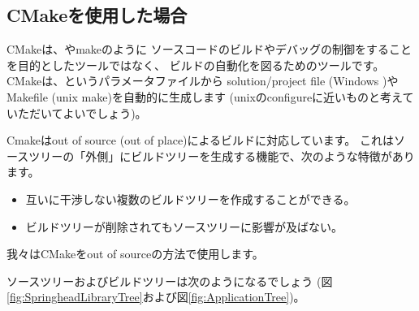 \subsection{CMakeを使用した場合}
\label{subsec:WhenUsedCMake}

\noindent
CMakeは、\VS やmakeのように
ソースコードのビルドやデバッグの制御をすることを目的としたツールではなく、
ビルドの自動化を図るためのツールです。
CMakeは、\CMakeLists{}というパラメータファイルから
solution/project file (Windows \VS)やMakefile (unix make)を自動的に生成します
(unixのconfigureに近いものと考えていただいてよいでしょう)。

\medskip
\noindent
Cmakeはout of source (out of place)によるビルドに対応しています。
これはソースツリーの「外側」にビルドツリーを生成する機能で、次のような特徴があります。
\begin{itemize}
  \item	互いに干渉しない複数のビルドツリーを作成することができる。
  \item	ビルドツリーが削除されてもソースツリーに影響が及ばない。
\end{itemize}
我々はCMakeをout of sourceの方法で使用します。

\medskip
\noindent
ソースツリーおよびビルドツリーは次のようになるでしょう
(図\ref{fig:SpringheadLibraryTree}および図\ref{fig:ApplicationTree})。

